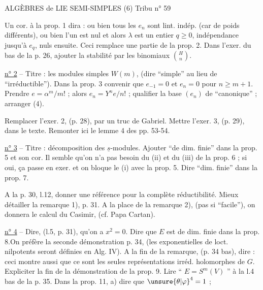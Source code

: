
ALGÈBRES de LIE SEMI-SIMPLES (6) \hfill Tribu n° 59

Un cor. à la prop. 1 dira : ou bien tous les $e_n$ sont lint. indép. (car de poids différents), ou bien l'un est nul et alors $\lambda$ est un entier $q\geq 0$, indépendance jusqu'à $e_q$, nuls ensuite. Ceci remplace une partie de la prop. 2. Dans l'exer. du bas de la p. 26, ajouter la stabilité par les binomiaux $\binom{H}{n}$.

\uline{n° 2} -- Titre : les modules simples $W(m)$, (dire ``simple'' au lieu de ``irréductible''). Dans la prop. 3 convenir que $e_{-1}=0$ et $e_n=0$ pour $n\geq m+1$. Prendre $e=\alpha^m/m!$ ; alors $e_n=Y^ne/n!$ ; qualifier la base $(e_n)$ de ``canonique'' ; arranger (4).

Remplacer l'exer. 2, (p. 28), par un truc de Gabriel. Mettre l'exer. 3, (p. 29), dans le texte. Remonter ici le lemme 4 des pp. 53-54.

\uline{n° 3} -- Titre : décomposition des $\underline{s}$-modules. Ajouter ``de dim. finie'' dans la prop. 5 et son cor. Il semble qu'on n'a pas besoin du (ii) et du (iii) de la prop. 6 ; si oui, ça passe en exer. et on bloque le (i) avec la prop. 5. Dire ``dim. finie'' dans la prop. 7.

A la p. 30, l.12, donner une référence pour la complète réductibilité. Mieux détailler la remarque 1), p. 31. A la place de la remarque 2), (pas si ``facile''), on donnera le calcul du Casimir, (cf. Papa Cartan).

\uline{n° 4} -- Dire, (l.5, p. 31), qu'on a $x^2=0$. Dire que $E$ est de dim. finie dans la prop. 8.On préfère la seconde démonstration p. 34, (les exponentielles de loct. nilpotents seront définies en Alg. IV). A la fin de la remarque, (p. 34 bas), dire : ceci montre aussi que ce sont les seules représentations irréd. holomorphes de $G$. Expliciter la fin de la démonstration de la prop. 9. Lire `` $E=S^m(V)$ '' à la l.4 bas de la p. 35. Dans la prop. 11, a) dire que $\unsure{\theta|\varphi}^4=1$ ;
